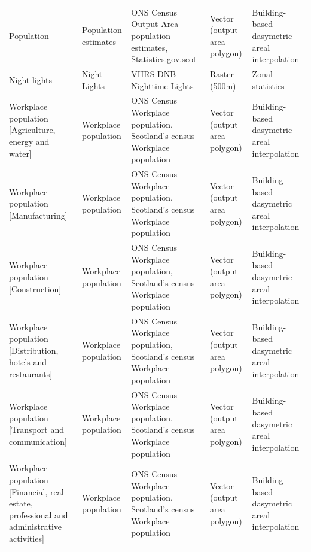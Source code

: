 \documentclass[fleqn,10pt]{wlscirep}
\begin{document}
\begin{longtable}{p{}p{}p{}p{}p{}}
    \bottomrule
    \endlastfoot
                                                                                                Population &               Population estimates  &           ONS Census Output Area population estimates, Statistics.gov.scot  &      Vector (output area polygon)  &  Building-based dasymetric areal interpolation  \\
                                                                                            Night lights &                       Night Lights  &                                                 VIIRS DNB Nighttime Lights  &                     Raster (500m)  &                               Zonal statistics  \\
                                                    Workplace population [Agriculture, energy and water] &               Workplace population  &    ONS Census Workplace population, Scotland's census Workplace population  &      Vector (output area polygon)  &  Building-based dasymetric areal interpolation  \\
                                                                    Workplace population [Manufacturing] &               Workplace population  &    ONS Census Workplace population, Scotland's census Workplace population  &      Vector (output area polygon)  &  Building-based dasymetric areal interpolation  \\
                                                                    Workplace population [Construction] &               Workplace population  &    ONS Census Workplace population, Scotland's census Workplace population  &      Vector (output area polygon)  &  Building-based dasymetric areal interpolation  \\
                                            Workplace population [Distribution, hotels and restaurants] &               Workplace population  &    ONS Census Workplace population, Scotland's census Workplace population  &      Vector (output area polygon)  &  Building-based dasymetric areal interpolation  \\
                                                        Workplace population [Transport and communication] &               Workplace population  &    ONS Census Workplace population, Scotland's census Workplace population  &      Vector (output area polygon)  &  Building-based dasymetric areal interpolation  \\
                Workplace population [Financial, real estate, professional and administrative activities] &               Workplace population  &    ONS Census Workplace population, Scotland's census Workplace population  &      Vector (output area polygon)  &  Building-based dasymetric areal interpolation  \\

\end{longtable}
\end{document}
